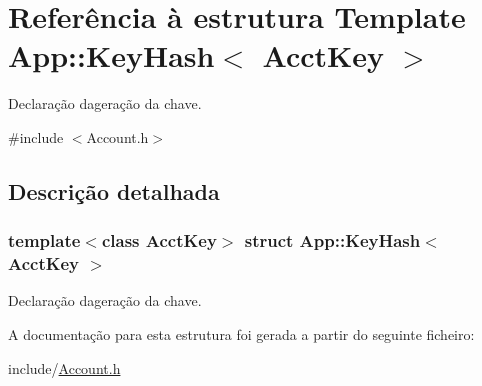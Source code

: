 \hypertarget{structApp_1_1KeyHash}{}\section{Referência à estrutura Template App\+:\+:Key\+Hash$<$ Acct\+Key $>$}
\label{structApp_1_1KeyHash}


Declaração da\textquotesingle{}geração da chave.  




{\ttfamily \#include $<$Account.\+h$>$}



\subsection{Descrição detalhada}
\subsubsection*{template$<$class Acct\+Key$>$\newline
struct App\+::\+Key\+Hash$<$ Acct\+Key $>$}

Declaração da\textquotesingle{}geração da chave. 

A documentação para esta estrutura foi gerada a partir do seguinte ficheiro\+:\begin{DoxyCompactItemize}
\item 
include/\hyperlink{Account_8h}{Account.\+h}\end{DoxyCompactItemize}

